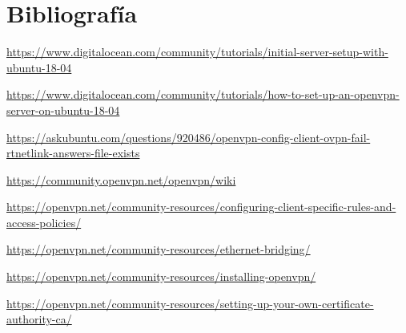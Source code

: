 \documentclass[11pt,a4paper]{article}
\begin{document}
\newpage

\section{Bibliografía}

\url{https://www.digitalocean.com/community/tutorials/initial-server-setup-with-ubuntu-18-04}

\url{https://www.digitalocean.com/community/tutorials/how-to-set-up-an-openvpn-server-on-ubuntu-18-04}

\url{https://askubuntu.com/questions/920486/openvpn-config-client-ovpn-fail-rtnetlink-answers-file-exists}

\url{https://community.openvpn.net/openvpn/wiki}

\url{https://openvpn.net/community-resources/configuring-client-specific-rules-and-access-policies/}

\url{https://openvpn.net/community-resources/ethernet-bridging/}

\url{https://openvpn.net/community-resources/installing-openvpn/}

\url{https://openvpn.net/community-resources/setting-up-your-own-certificate-authority-ca/}
\end{document}
